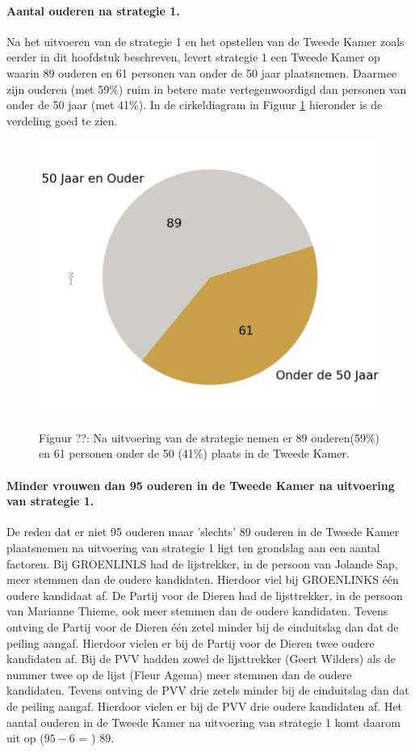 \paragraph{Aantal ouderen na strategie 1.}
Na het uitvoeren van de strategie 1 en het opstellen van de Tweede Kamer zoals eerder in dit hoofdstuk beschreven, levert strategie 1 een Tweede Kamer op waarin  89 ouderen en 61 personen van onder de 50 jaar plaatsnemen. Daarmee zijn ouderen (met 59\%) ruim in betere mate vertegenwoordigd dan personen van onder de 50 jaar (met 41\%). In de cirkeldiagram in Figuur \ref{fig:pcS1O} hieronder is de verdeling goed te zien. 

\begin{figure}[H]
\centering
	\includegraphics[width=0.42\linewidth]{pie_chart_topN_ouderen.png}

			Figuur ??: Na uitvoering van de strategie nemen er 89 ouderen(59\%) en 61 personen onder de 50 (41\%) plaats in de Tweede Kamer. 

\label{fig:pcS1O}
\end{figure}

\paragraph{Minder vrouwen dan 95 ouderen in de Tweede Kamer na uitvoering van strategie 1.}
De reden dat er niet 95 ouderen maar 'slechts' 89 ouderen in de Tweede Kamer plaatsnemen na uitvoering van strategie 1 ligt ten grondslag aan een aantal factoren. Bij GROENLINLS had de lijstrekker, in de persoon van Jolande 
Sap, meer stemmen dan de oudere kandidaten. Hierdoor viel bij GROENLINKS één oudere kandidaat af. De Partij voor de Dieren had de lijsttrekker, in de persoon van Marianne Thieme, ook meer stemmen dan de oudere kandidaten. Tevens ontving de Partij voor de Dieren één zetel minder bij de einduitslag dan dat de peiling aangaf. Hierdoor vielen er bij de Partij voor de Dieren twee oudere kandidaten af. Bij de PVV hadden zowel de lijsttrekker (Geert Wilders) als de nummer twee op de lijst (Fleur Agema) meer stemmen dan de oudere kandidaten. Tevens ontving de PVV drie zetels minder bij de einduitslag dan dat de peiling aangaf. Hierdoor vielen er bij de PVV drie oudere kandidaten af. Het aantal ouderen in de Tweede Kamer na uitvoering van strategie 1 komt daarom uit op ($95-6$ = ) 89. 





